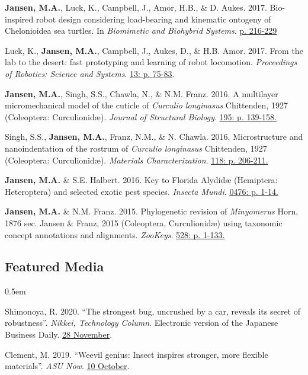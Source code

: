 \documentclass[12pt,a4paper]{article}
\begin{document}
\begin{description}
		\item \textbf{Jansen, M.A.}, Luck, K., Campbell, J., Amor, H.B., \& D. Aukes. 2017. Bio-inspired robot design considering load-bearing and kinematic ontogeny of Chelonioidea sea turtles. In \textit{Biomimetic and Biohybrid Systems}. \href{http://www.springer.com/us/book/9783319635361}{p. 216-229}
		
		\item Luck, K., \textbf{Jansen, M.A.}, Campbell, J., Aukes, D., \& H.B. Amor. 2017. From the lab to the desert: fast prototyping and learning of robot locomotion. \textit{Proceedings of Robotics: Science and Systems}. \href{http://www.roboticsproceedings.org/rss13/p75.html}{13: p. 75-83}.
		
		\item \textbf{Jansen, M.A.}, Singh, S.S., Chawla, N., \& N.M. Franz. 2016. A multilayer micromechanical model of the cuticle of \textit{Curculio longinasus} Chittenden, 1927 (Coleoptera: Curculionid\ae). \textit{Journal of Structural Biology}. \href{http://www.sciencedirect.com/science/article/pii/S1047847716300922}{195: p. 139-158.}
		
		\item Singh, S.S., \textbf{Jansen, M.A.}, Franz, N.M., \& N. Chawla. 2016. Microstructure and nanoindentation of the rostrum of \textit{Curculio longinasus} Chittenden, 1927 (Coleoptera: Curculionid\ae). \textit{Materials Characterization}. \href{http://www.sciencedirect.com/science/article/pii/S1044580316301619}{118: p. 206-211.}
		
		\item \textbf{Jansen, M.A.} \& S.E. Halbert. 2016. Key to Florida Alydid{\ae} (Hemiptera: Heteroptera) and selected exotic pest species. \textit{Insecta Mundi}. \href{http://journals.fcla.edu/mundi/article/view/87952/84644}{0476: p. 1-14.}
		
		\item \textbf{Jansen, M.A.} \& N.M. Franz. 2015. Phylogenetic revision of \textit{Minyomerus} Horn, 1876 sec. Jansen \& Franz, 2015 (Coleoptera, Curculionid\ae) using taxonomic concept annotations and alignments. \textit{ZooKeys}. \href{http://zookeys.pensoft.net/articles.php?id=6001}{528: p. 1-133.}
	\end{description}
	
	\subsection*{Featured Media}
	\begin{description}
		\itemsep0.5em
		\item Shimonoya, R. 2020. ``The strongest bug, uncrushed by a car, reveals its secret of robustness''. \textit{Nikkei, Technology Column}. Electronic version of the Japanese Business Daily. \href{https://www.nikkei.com/article/DGXMZO66746060X21C20A1MY1000/}{28 November}.
		\item Clement, M. 2019. ``Weevil genius: Insect inspires stronger, more flexible materials''. \textit{ASU Now}. \href{https://asunow.asu.edu/20191010-discoveries-asu-engineering-weevil-inspires-stronger-flexible-materials}{10 October}.
		
	\end{description}
\end{document}
